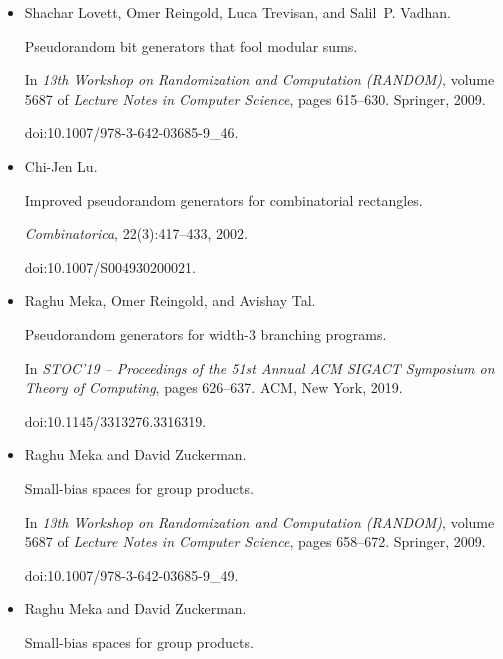 \begin{itemize}
\item[] 
[35]

Shachar Lovett, Omer Reingold, Luca Trevisan, and Salil P. Vadhan.


Pseudorandom bit generators that fool modular sums.


In \emph{13th Workshop on Randomization and Computation (RANDOM)},
volume 5687 of \emph{Lecture Notes in Computer Science}, pages 615–630.
Springer, 2009.


doi:10.1007/978-3-642-03685-9\_46.





\item[] 
[36]

Chi-Jen Lu.


Improved pseudorandom generators for combinatorial rectangles.


\emph{Combinatorica}, 22(3):417–433, 2002.


doi:10.1007/S004930200021.





\item[] 
[37]

Raghu Meka, Omer Reingold, and Avishay Tal.


Pseudorandom generators for width-3 branching programs.


In \emph{STOC’19 – Proceedings of the 51st Annual ACM
SIGACT Symposium on Theory of Computing}, pages 626–637. ACM, New
York, 2019.


doi:10.1145/3313276.3316319.





\item[] 
[38]

Raghu Meka and David Zuckerman.


Small-bias spaces for group products.


In \emph{13th Workshop on Randomization and Computation (RANDOM)},
volume 5687 of \emph{Lecture Notes in Computer Science}, pages 658–672.
Springer, 2009.


doi:10.1007/978-3-642-03685-9\_49.





\item[] 
[39]

Raghu Meka and David Zuckerman.


Small-bias spaces for group products.



\end{itemize}
